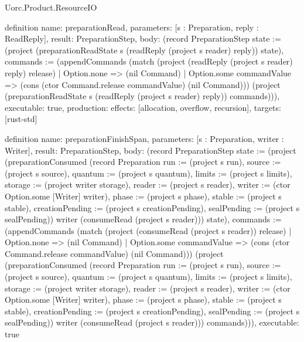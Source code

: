 \begin{lexlean}{Uorc.Product.ResourceIO}
\begin{semanticmodule}
definition{
  name: preparationRead,
  parameters: [s : Preparation, reply : ReadReply],
  result: PreparationStep,
  body: (record PreparationStep {state := (project (preparationReadState s (readReply (project s reader) reply)) state), commands := (appendCommands (match (project (readReply (project s reader) reply) release)
    | Option.none => (nil Command)
    | Option.some commandValue => (cons (ctor Command.release commandValue) (nil Command))) (project (preparationReadState s (readReply (project s reader) reply)) commands))}),
  executable: true,
  production: {effects: [allocation, overflow, recursion], targets: [rust-std]}
}

definition{
  name: preparationFinishSpan,
  parameters: [s : Preparation, writer : Writer],
  result: PreparationStep,
  body: (record PreparationStep {state := (project (preparationConsumed (record Preparation {run := (project s run), source := (project s source), quantum := (project s quantum), limits := (project s limits), storage := (project writer storage), reader := (project s reader), writer := (ctor Option.some [Writer] writer), phase := (project s phase), stable := (project s stable), creationPending := (project s creationPending), sealPending := (project s sealPending)}) writer (consumeRead (project s reader))) state), commands := (appendCommands (match (project (consumeRead (project s reader)) release)
    | Option.none => (nil Command)
    | Option.some commandValue => (cons (ctor Command.release commandValue) (nil Command))) (project (preparationConsumed (record Preparation {run := (project s run), source := (project s source), quantum := (project s quantum), limits := (project s limits), storage := (project writer storage), reader := (project s reader), writer := (ctor Option.some [Writer] writer), phase := (project s phase), stable := (project s stable), creationPending := (project s creationPending), sealPending := (project s sealPending)}) writer (consumeRead (project s reader))) commands))}),
  executable: true
}


\end{semanticmodule}
\end{lexlean}
